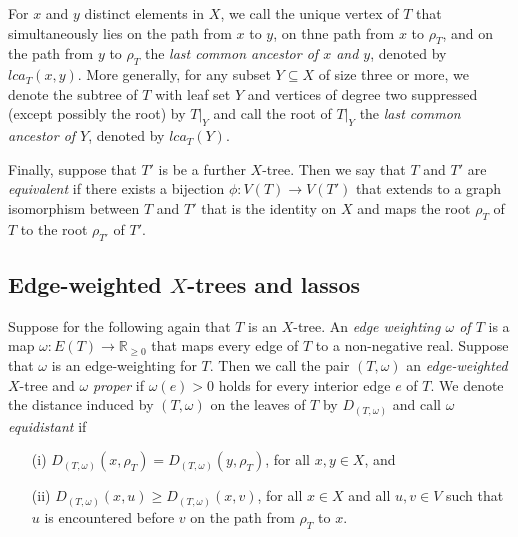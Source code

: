 For $x$ and $y$ distinct elements in $X$, we call the unique vertex of $T$
that simultaneously lies on the path from $x$ to $y$, on thne path from $x$ to
$\rho_T$, and on the path from $y$ to $\rho_T$ the {\em last common ancestor
  of $x$ and $y$}, denoted by $lca_T(x,y)$. More generally, for any subset
$Y\subseteq X$ of size three or more, we denote the subtree of $T$ with leaf
set $Y$ and vertices of degree two suppressed (except possibly the root) by
$T|_Y$ and call the root of $T|_Y$ the {\em last common ancestor of $Y$},
denoted by $lca_T(Y)$.

Finally, suppose that $T'$ is be a further $X$-tree. Then we say that $T$ and
$T'$ are {\em equivalent} if there exists a bijection $\phi:V(T)\to V(T')$
that extends to a graph isomorphism between $T$ and $T'$ that is the identity
on $X$ and maps the root $\rho_T$ of $T$ to the root $\rho_{T'}$ of $T'$.


\subsection{Edge-weighted $X$-trees and lassos}

Suppose for the following again that $T$ is an $X$-tree.  An {\em edge
  weighting $\omega$ of $T$} is a map $\omega :E(T)\to \mathbb R_{\geq 0}$
that maps every edge of $T$ to a non-negative real. Suppose that $\omega$ is
an edge-weighting for $T$. Then we call the pair $(T,\omega)$ an {\em
  edge-weighted} $X$-tree and $\omega$ {\em proper} if $\omega(e)>0$ holds for
every interior edge $e$ of $T$. We denote the distance induced by $(T,\omega)$
on the leaves of $T$ by $D_{(T,\omega)}$ and call $\omega$ {\em equidistant}
if
\begin{enumerate}
\item[(i)] $D_{(T,\omega)}(x,\rho_T)=  D_{(T,\omega)}(y,\rho_T)$, for all
$x,y\in X$, and
\item[(ii)] $D_{(T,\omega)}(x,u)\geq D_{(T,\omega)}(x,v)$, for all $x\in X$
  and all $u,v\in V$ such that $u$ is encountered before $v$ on the path from
  $\rho_T$ to $x$.
\end{enumerate} 

